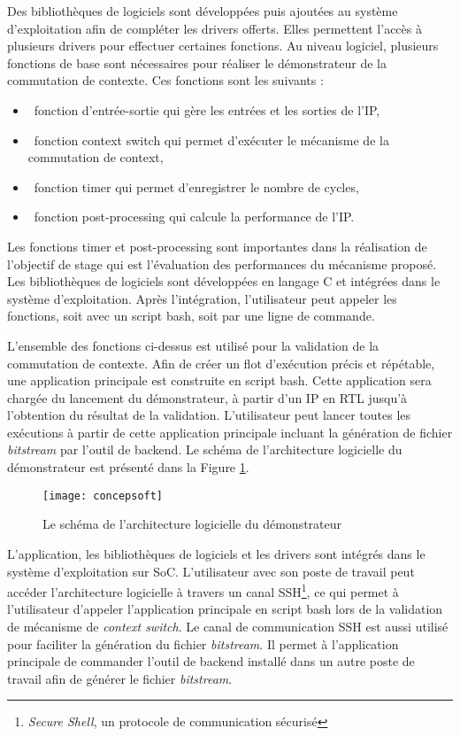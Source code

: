 Des bibliothèques de logiciels sont développées puis ajoutées au système d'exploitation afin de compléter les drivers offerts. 
Elles permettent l'accès à plusieurs drivers pour effectuer certaines fonctions.
Au niveau logiciel, plusieurs fonctions de base sont nécessaires pour réaliser le démonstrateur de la commutation
de contexte. Ces fonctions sont les suivants :
\begin{itemize}
	\item\ fonction d'entrée-sortie qui gère les entrées et les sorties de l'IP, 
	\item\ fonction context switch qui permet d'exécuter le mécanisme de la commutation de context, 
	\item\ fonction timer qui permet d'enregistrer le nombre de cycles,
	\item\ fonction post-processing qui calcule la performance de l'IP.
\end{itemize}
Les fonctions timer et post-processing sont importantes dans la réalisation de l'objectif de stage qui est l'évaluation des performances
du mécanisme proposé. Les bibliothèques de logiciels sont développées en langage C et intégrées dans le système d'exploitation.
Après l'intégration, l'utilisateur peut appeler les fonctions, soit avec un script bash, soit par une ligne de commande.

L'ensemble des fonctions ci-dessus est utilisé pour la validation de la commutation de contexte.
Afin de créer un flot d'exécution précis et répétable, une application principale est construite en script bash. 
Cette application sera chargée du lancement du démonstrateur, à partir d'un IP en RTL jusqu'à l'obtention du résultat de la validation.
L'utilisateur peut lancer toutes les exécutions à partir de cette application principale incluant la génération de fichier
\emph{bitstream} par l'outil de backend.
Le schéma de l'architecture logicielle du démonstrateur est présenté dans la Figure \ref{fig:concepsoft}.

\begin{figure}[h]
	\centering
	\texttt{[image: concepsoft]}
	\caption{Le schéma de l'architecture logicielle du démonstrateur}
	\label{fig:concepsoft}
	\vspace{-2mm}
\end{figure}

L'application, les bibliothèques de logiciels et les drivers sont intégrés dans
le système d'exploitation sur SoC. L'utilisateur avec son poste de travail peut accéder
l'architecture logicielle à travers un canal SSH\footnote{\emph{Secure Shell}, un protocole de communication sécurisé},
ce qui permet à l'utilisateur d'appeler l'application principale en script bash lors de la validation de mécanisme de \emph{context switch}.
Le canal de communication SSH est aussi utilisé pour faciliter la génération du fichier \emph{bitstream}.
Il permet à l'application principale de commander l'outil de backend installé dans un
autre poste de travail afin de générer le fichier \emph{bitstream}.

